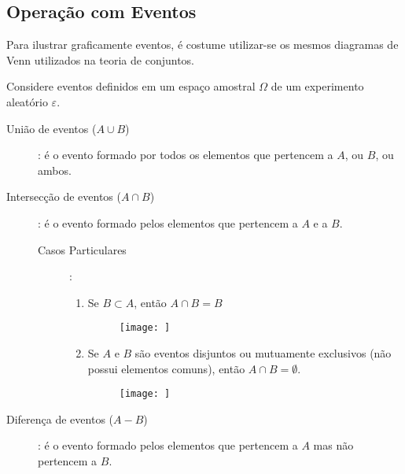 \documentclass[11pt,a4paper]{book}
\begin{document}
\subsection{Operação com Eventos}
Para ilustrar graficamente eventos, é costume utilizar-se os mesmos diagramas de Venn utilizados na teoria de conjuntos.

Considere eventos definidos em um espaço amostral $\Omega$ de um experimento aleatório $\varepsilon$.

\begin{description}
  \item [União de eventos ($A \cup B$)]: é o evento formado por todos os elementos que pertencem a $A$, ou  $B$, ou ambos.
   \begin{figure}[H]
     \centering
     
       \caption{}
       \label{figura:1}
     \end{figure} 
  \item [Intersecção de eventos ($A \cap B$)]: é o evento formado pelos elementos que pertencem a $A$ e a $B$.
    \begin{figure}[H]
      \centering
      
      \caption{}
      \label{figura:2}
    \end{figure} 
    \begin{description}
      \item[Casos Particulares]:
    \begin{enumerate}
      \item Se $B \subset A$, então $A \cap B= B$ 

        \begin{figure}[]
          \centering
          \texttt{[image: ]}
          \caption{}
          \label{figura:3}
        \end{figure}

      \item Se $A$ e $B$ são eventos disjuntos ou mutuamente exclusivos (não possui elementos comuns), então $A\cap B = \emptyset$.

        \begin{figure}[]
          \centering
          \texttt{[image: ]}
          \caption{}
          \label{figura:4}
        \end{figure}

    \end{enumerate}
  \end{description}
  \item[Diferença de eventos ($A-B$)]: é o evento formado pelos elementos que pertencem a $A$ mas não pertencem a $B$.


\end{description}
\end{document}
